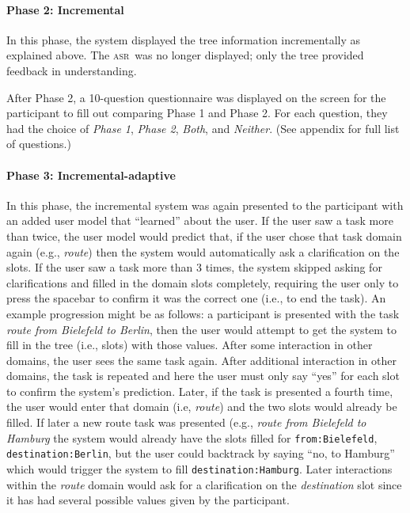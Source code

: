 \documentclass[11pt]{article}
\newcommand{\asr}[0]{\textsc{asr}}
\begin{document}
\paragraph{Phase 2: Incremental} In this phase, the system displayed the tree information incrementally as explained above. The \asr\ was no longer displayed; only the tree provided feedback in understanding. 

After Phase 2, a 10-question questionnaire was displayed on the screen for the participant to fill out comparing Phase 1 and Phase 2. For each question, they had the choice of \emph{Phase 1}, \emph{Phase 2}, \emph{Both}, and \emph{Neither}. (See appendix for full list of questions.) 

\paragraph{Phase 3: Incremental-adaptive} In this phase, the incremental system was again presented to the participant with an added user model that ``learned'' about the user. If the user saw a task more than twice, the user model would predict that, if the user chose that task domain again (e.g., \emph{route}) then the system would automatically ask a clarification on the slots. If the user saw a task more than 3 times, the system skipped asking for clarifications and filled in the domain slots completely, requiring the user only to press the spacebar to confirm it was the correct one (i.e., to end the task). An example progression might be as follows: a participant is presented with the task \emph{route from Bielefeld to Berlin}, then the user would attempt to get the system to fill in the tree (i.e., slots) with those values. After some interaction in other domains, the user sees the same task again. After additional interaction in other domains, the task is repeated and here the user must only say ``yes'' for each slot to confirm the system's prediction. Later, if the task is presented a fourth time, the user would enter that domain (i.e, \emph{route}) and the two slots would already be filled. If later a new route task was presented (e.g., \emph{route from Bielefeld to Hamburg} the system would already have the slots filled for \texttt{from:Bielefeld}, \texttt{destination:Berlin}, but the user could backtrack by saying ``no, to Hamburg'' which would trigger the system to fill \texttt{destination:Hamburg}. Later interactions within the \emph{route} domain would ask for a clarification on the \emph{destination} slot since it has had several possible values given by the participant. 
\end{document}
